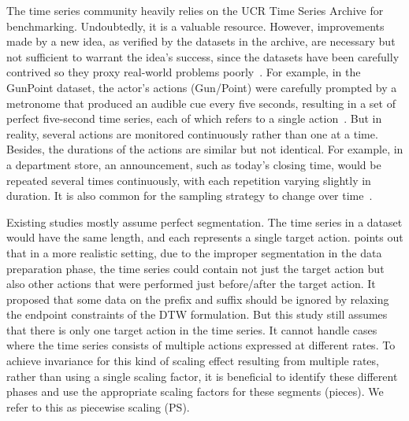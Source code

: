The time series community heavily relies on the UCR Time Series Archive for benchmarking.
Undoubtedly, it is a valuable resource.
However, improvements made by a new idea, as verified by the datasets in the archive, are necessary but not sufficient to warrant the idea's success, since the datasets have been carefully contrived so they proxy real-world problems poorly~\cite{silva2016prefix, gharghabi2018matrix}.
%
For example, in the GunPoint dataset, the actor's actions (Gun/Point) were carefully prompted by a metronome that produced an audible cue every five seconds, resulting in a set of perfect five-second time series, each of which refers to a single action~\cite{silva2016prefix}.
But in reality, several actions are monitored continuously rather than one at a time.
Besides, the durations of the actions are similar but not identical.
For example, in a department store, an announcement, such as today's closing time, would be repeated several times continuously, with each repetition varying slightly in duration.
It is also common for the sampling strategy to change over time~\cite{aggarwal2013data}.

Existing studies mostly assume perfect segmentation. 
The time series in a dataset would have the same length, and each represents a single target action.
\cite{silva2016prefix} points out that in a more realistic setting, due to the improper segmentation in the data preparation phase, the time series could contain not just the target action but also other actions that were performed just before/after the target action.
It proposed that some data on the prefix and suffix should be ignored by relaxing the endpoint constraints of the DTW formulation.
But this study still assumes that there is only one target action in the time series. It cannot handle cases where the time series consists of multiple actions expressed at different rates.
%
To achieve invariance for this kind of scaling effect resulting from multiple rates, rather than using a single scaling factor, it is beneficial to identify these different phases and use the appropriate scaling factors for these segments (pieces).
We refer to this as piecewise scaling (PS).

